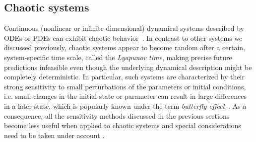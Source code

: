 




\subsection{Chaotic systems}



Continuous (nonlinear or infinite-dimensional) dynamical systems described by ODEs or PDEs can exhibit chaotic behavior~\cite{strogatz2018nonlinear}. 
In contrast to other systems we discussed previously, chaotic systems appear to become random after a certain, system-specific time scale, called the \textit{Lyapunov time}, making precise future predictions infeasible even though the underlying dynamical description might be completely deterministic.
In particular, such systems are characterized by their strong sensitivity to small perturbations of the parameters or initial conditions, i.e. small changes in the initial state or parameter can result in large differences in a later state, which is popularly known under the term \textit{butterfly effect}~\cite{Lorenz.1963}. 
As a consequence, all the sensitivity methods discussed in the previous sections become less useful when applied to chaotic systems and special considerations need to be taken under account \cite{Wang2012-chaos-adjoint}.

